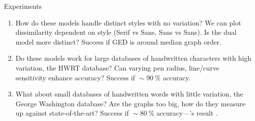 \documentclass[10pt]{beamer}
\begin{document}
\begin{frame}{Experiments}
	\begin{enumerate}[<alert@+>]
		\item How do these models handle distinct styles with no variation?
		We can plot dissimilarity dependent on style (Serif vs Sans, Sans vs Sans).
		Is the dual model more distinct?
		Success if GED is around median graph order.
		
		\item Do these models work for large databases of handwritten characters with high variation, the HWRT database?
		Can varying pen radius, line/curve sensitivity enhance accuracy?
		Success if ${}\sim\SI{90}{\percent}$ accuracy.
		
		\item What about small databases of handwritten words with little variation, the George Washington database?
		Are the graphs too big, how do they measure up against state-of-the-art?
		Success if ${}\sim\SI{80}{\percent}$ accuracy---\citeauthor{Graphs-Handwriting}'s result \cite{Graphs-Handwriting}.
	\end{enumerate}
\end{frame}
\end{document}
